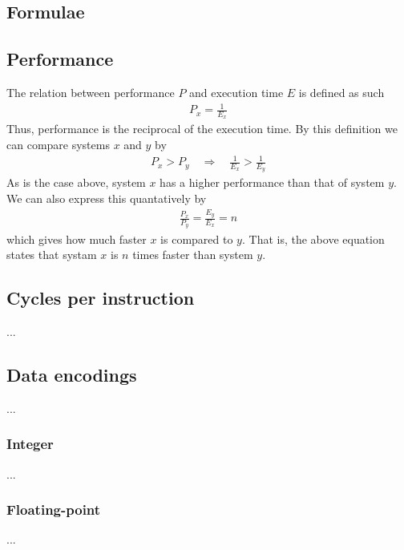 %
%

\begin{appendices}
	\section{Formulae}
	\subsection{Performance}
	\label{appendix:formulae|sub:performance}
	The relation between performance $P$ and execution time $E$ is defined as
	such
	\begin{align*}
		P_x = \frac{1}{E_x}
	\end{align*}
	Thus, performance is the reciprocal of the execution time. By this
	definition we can compare systems $x$ and $y$ by
	\begin{align*}
		P_x > P_y \quad\Rightarrow\quad \frac{1}{E_x} > \frac{1}{E_y}
	\end{align*}
	As is the case above, system $x$ has a higher performance than that of
	system $y$. We can also express this quantatively by
	\begin{align*}
		\frac{P_x}{P_y} = \frac{E_y}{E_x} = n
	\end{align*}
	which gives how much faster $x$ is compared to $y$. That is, the above
	equation states that systam $x$ is $n$ times faster than system $y$.
	
	\subsection{Cycles per instruction}
	...
	
	\subsection{Data encodings}
	...
	
	\begin{multicols}{2}
	\subsubsection{Integer}
	...
	\vfill
	\columnbreak
	\subsubsection{Floating-point}
	...
	\end{multicols}
	
\end{appendices}


